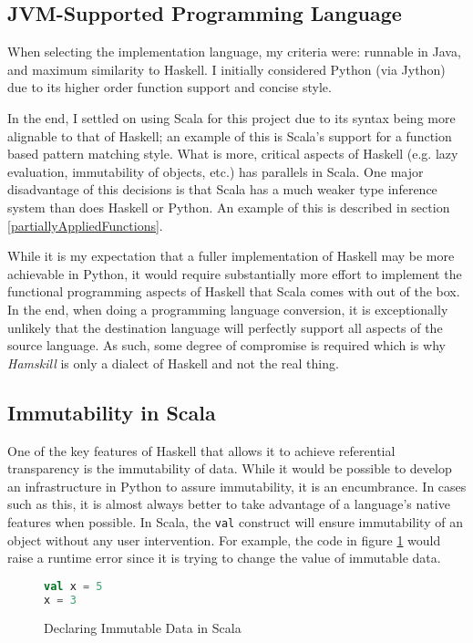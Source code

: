 \documentclass{report}
\begin{document}
\subsection{JVM-Supported Programming Language}

When selecting the implementation language, my criteria were: runnable in Java, and maximum similarity to Haskell.  I initially considered Python (via Jython) due to its higher order function support and concise style.  

In the end, I settled on using Scala for this project due to its syntax being more alignable to that of Haskell; an example of this is Scala's support for a function based pattern matching style.  What is more, critical aspects of Haskell (e.g. lazy evaluation, immutability of objects, etc.) has parallels in Scala.  One major disadvantage of this decisions is that Scala has a much weaker type inference system than does Haskell or Python.  An example of this is described in section \ref{partiallyAppliedFunctions}.  

While it is my expectation that a fuller implementation of Haskell may be more achievable in Python, it would require substantially more effort to implement the functional programming aspects of Haskell that Scala comes with out of the box.  In the end, when doing a programming language conversion, it is exceptionally unlikely that the destination language will perfectly support all aspects of the source language.  As such, some degree of compromise is required which is why \emph{Hamskill} is only a dialect of Haskell and not the real thing.


\subsection{Immutability in Scala}\label{sec:immutabilityScala}

One of the key features of Haskell that allows it to achieve referential transparency is the immutability of data.  While it would be possible to develop an infrastructure in Python to assure immutability, it is an encumbrance.  In cases such as this, it is almost always better to take advantage of a language's native features when possible.    In Scala, the {\tt val} construct will ensure immutability of an object without any user intervention.  For example, the code in figure \ref{fig:immutabilityInScala} would raise a runtime error since it is trying to change the value of immutable data.

\begin{figure}[H]\label{fig:immutabilityInScala}
\begin{mdframed}
\begin{lstlisting}[language=Scala]
val x = 5
x = 3
\end{lstlisting}
\end{mdframed}
\caption{Declaring Immutable Data in Scala}
\end{figure}
\end{document}
